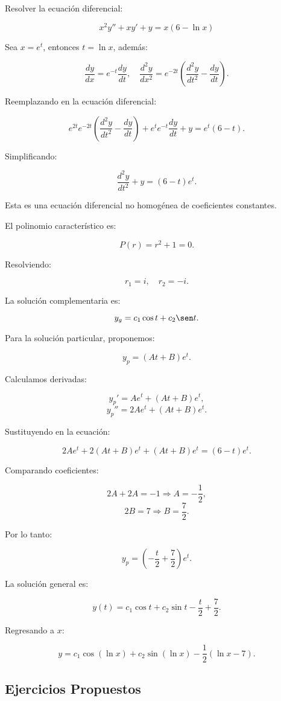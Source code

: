 Resolver la ecuación diferencial:

\[
    x^2 y'' + xy' + y = x(6 - \ln x)
\]

Sea $x = e^t$, entonces $t = \ln x$, además:

\[
    \frac{dy}{dx} = e^{-t} \frac{dy}{dt}, \quad \frac{d^2 y}{dx^2} = e^{-2t} \left( \frac{d^2 y}{dt^2} - \frac{dy}{dt} \right).
\]

Reemplazando en la ecuación diferencial:

\[
    e^{2t} e^{-2t} \left( \frac{d^2 y}{dt^2} - \frac{dy}{dt} \right) + e^t e^{-t} \frac{dy}{dt} + y = e^t (6 - t).
\]

Simplificando:

\[
    \frac{d^2 y}{dt^2} + y = (6 - t)e^t.
\]

Esta es una ecuación diferencial no homogénea de coeficientes constantes.

El polinomio característico es:

\[
    P(r) = r^2 + 1 = 0.
\]

Resolviendo:

\[
    r_1 = i, \quad r_2 = -i.
\]

La solución complementaria es:

\[
    y_g = c_1 \cos t + c_2 \sen t.
\]

Para la solución particular, proponemos:

\[
    y_p = (At + B)e^t.
\]

Calculamos derivadas:

\[
    y_p' = Ae^t + (At + B)e^t,
\]
\[
    y_p'' = 2Ae^t + (At + B)e^t.
\]

Sustituyendo en la ecuación:

\[
    2Ae^t + 2(At + B)e^t + (At + B)e^t = (6 - t)e^t.
\]

Comparando coeficientes:

\[
    2A + 2A = -1 \Rightarrow A = -\frac{1}{2},
\]
\[
    2B = 7 \Rightarrow B = \frac{7}{2}.
\]

Por lo tanto:

\[
    y_p = \left(-\frac{t}{2} + \frac{7}{2}\right)e^t.
\]

La solución general es:

\[
    y(t) = c_1 \cos t + c_2 \sin t - \frac{t}{2} + \frac{7}{2}.
\]

Regresando a $x$:

\[
    y = c_1 \cos (\ln x) + c_2 \sin (\ln x) - \frac{1}{2} (\ln x - 7).
\]

\subsection{Ejercicios Propuestos}

